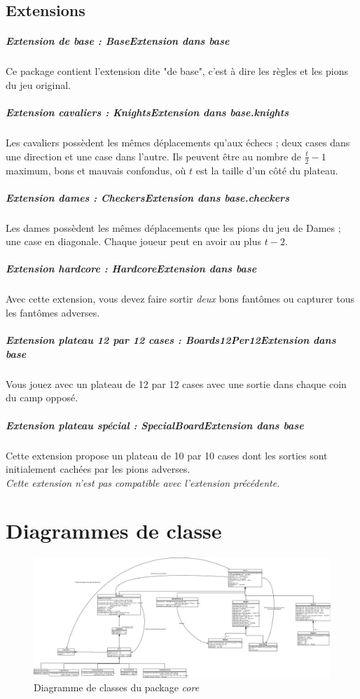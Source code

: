 \documentclass[]{report}
\begin{document}
\subsection{Extensions}
\subparagraph{Extension de base : \textit{BaseExtension} dans \textit{base}}
Ce package contient l'extension dite "de base", c'est à dire les règles et les pions du jeu original.

\subparagraph{Extension cavaliers : \textit{KnightsExtension} dans \textit{base.knights}}
Les cavaliers possèdent les mêmes déplacements qu'aux échecs ; deux cases dans une direction et une case dans l'autre. Ils peuvent être au nombre de $\frac{t}{2}-1$ maximum, bons et mauvais confondus, où $t$ est la taille d'un côté du plateau.

\subparagraph{Extension dames : \textit{CheckersExtension} dans \textit{base.checkers}}
Les dames possèdent les mêmes déplacements que les pions du jeu de Dames ; une case en diagonale. Chaque joueur peut en avoir au plus $t - 2$.

\subparagraph{Extension hardcore : \textit{HardcoreExtension} dans \textit{base}}
Avec cette extension, vous devez faire sortir \emph{deux} bons fantômes ou capturer tous les fantômes adverses.

\subparagraph{Extension plateau 12 par 12 cases : \textit{Boards12Per12Extension} dans \textit{base}}
Vous jouez avec un plateau de 12 par 12 cases avec une sortie dans chaque coin du camp opposé.

\subparagraph{Extension plateau spécial : \textit{SpecialBoardExtension} dans \textit{base}}
Cette extension propose un plateau de 10 par 10 cases dont les sorties sont initialement cachées par les pions adverses.\\
\emph{Cette extension n'est pas compatible avec l'extension précédente.}

\section{Diagrammes de classe}

\begin{figure}[!h]
	\caption{Diagramme de classes du package \textit{core}}
	\includegraphics[width=\textwidth]{core.png}
\end{figure}
\end{document}
